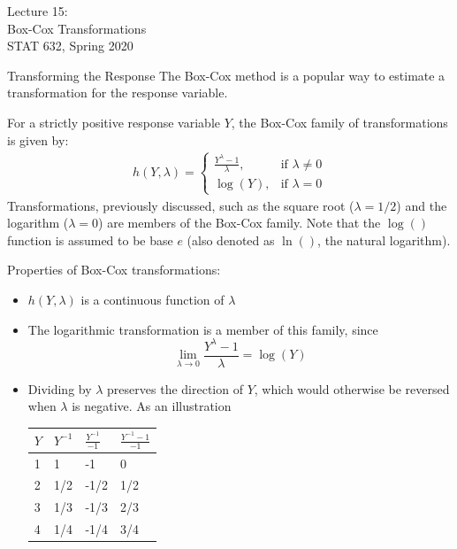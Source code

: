 \documentclass[10pt]{beamer}\usepackage[]{graphicx}\usepackage[]{color}
\begin{document}
\begin{frame}
\large
Lecture 15:\\ 
Box-Cox Transformations\\
STAT 632, Spring 2020\\
\end{frame}

\begin{frame}{Transforming the Response}
The Box-Cox method is a popular way to estimate a transformation for the response variable.\\
\vspace{10pt}

For a strictly positive response variable $Y$, the Box-Cox family of transformations is given by:
\begin{align*}
h(Y, \lambda) =
\begin{cases}
\frac{Y^{\lambda} - 1}{\lambda},& \text{if $\lambda \neq 0$}\\
\log(Y),& \text{if $\lambda = 0$}
\end{cases}
\end{align*}
Transformations, previously discussed, such as the square root ($\lambda = 1/2$) and the logarithm ($\lambda = 0$) are members of the Box-Cox family.  Note that the $\log()$ function is assumed to be base $e$ (also denoted as $\ln()$, the natural logarithm). 
\end{frame}

\begin{frame}
Properties of Box-Cox transformations:
\begin{itemize}
\item $h(Y, \lambda)$ is a continuous function of $\lambda$
\item The logarithmic transformation is a member of this family, since
$$\lim_{\lambda \rightarrow 0} \frac{Y^{\lambda} - 1}{\lambda} = \log(Y)$$
\item Dividing by $\lambda$ preserves the direction of $Y$, which would otherwise be reversed when $\lambda$ is negative.  As an illustration
\begin{table}
\begin{tabular}{llll}
\hline
$Y$ & $Y^{-1}$ & $\frac{Y^{-1}}{-1}$ & $\frac{Y^{-1}-1}{-1}$\\
\hline
1 & 1 & -1 & 0\\
2 & 1/2 & -1/2 & 1/2\\
3 & 1/3 & -1/3 & 2/3\\
4 & 1/4 & -1/4 & 3/4
\end{tabular}
\end{table}
\end{itemize}
\end{frame}
\end{document}
